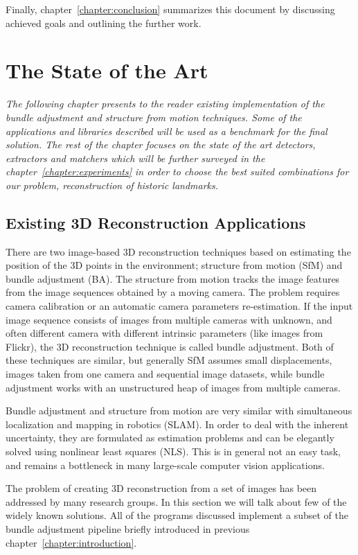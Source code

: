 Finally, chapter~\ref{chapter:conclusion} summarizes this document by discussing achieved goals and outlining the further work.

\chapter{The State of the Art}
\label{chapter:the-state-of-the-art}
\textit{The following chapter presents to the reader existing implementation of the bundle adjustment and structure from motion techniques. Some of the applications and libraries described will be used as a benchmark for the final solution. The rest of the chapter focuses on the state of the art detectors, extractors and matchers which will be further surveyed in the chapter~\ref{chapter:experiments} in order to choose the best suited combinations for our problem, reconstruction of historic landmarks.}

\section{Existing 3D Reconstruction Applications}
\label{sec:existing_3D_reconstruction_solutions}
There are two image-based 3D reconstruction techniques based on estimating the position of the 3D points in the environment; structure from motion (SfM) and bundle adjustment (BA). The structure from motion tracks the image features from the image sequences obtained by a moving camera. The problem requires camera calibration or an automatic camera parameters re-estimation. If the input image sequence consists of images from multiple cameras with unknown, and often different camera with different intrinsic parameters (like images from Flickr), the 3D reconstruction technique is called bundle adjustment. Both of these techniques are similar, but generally SfM assumes small displacements, images taken from one camera and sequential image datasets, while bundle adjustment works with an unstructured heap of images from multiple cameras.

Bundle adjustment and structure from motion are very similar with simultaneous localization and mapping in robotics (SLAM). In order to deal with the inherent uncertainty, they are formulated as estimation problems and can be elegantly solved using nonlinear least squares (NLS). This is in general not an easy task, and remains a bottleneck in many large-scale computer vision applications.

The problem of creating 3D reconstruction from a set of images has been addressed by many research groups. In this section we will talk about few of the widely known solutions. All of the programs discussed implement a subset of the bundle adjustment pipeline briefly introduced in previous chapter~\ref{chapter:introduction}.

